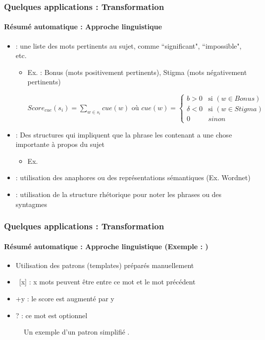 \documentclass[xcolor=table]{beamer}
\begin{document}
\begin{frame}
	\frametitle{Quelques applications : Transformation}
	\framesubtitle{Résumé automatique : Approche linguistique}
	
	\begin{itemize}
		\item {} : une liste des mots pertinents au sujet, comme ``significant", ``impossible", etc.
		\begin{itemize}
			\item Ex. \cite{69-edmundson} : Bonus (mots positivement pertinents), Stigma (mots négativement pertinents)
			
			$Score_{cue}(s_i) = \sum_{w \in s_i}{cue(w)}
			\text{ où }
			cue(w) = \left\lbrace 
			\begin{array}{ll}
			b > 0 & \text{si } (w \in Bonus) \\
			\delta < 0 & \text{si } (w \in Stigma) \\
			0 & sinon 
			\end{array} 
			\right. $
		\end{itemize}
		\item {} : Des structures qui impliquent que la phrase les contenant a une chose importante à propos du sujet
		\begin{itemize}
			\item Ex. 
		\end{itemize}
		\item {} : utilisation des anaphores ou des représentations sémantiques (Ex. Wordnet)
		\item {} : utilisation de la structure rhétorique pour noter les phrases ou des syntagmes
	\end{itemize}
	
\end{frame}

\begin{frame}
	\frametitle{Quelques applications : Transformation}
	\framesubtitle{Résumé automatique : Approche linguistique (Exemple : \cite{81-paice})}
	
	\begin{itemize}
		\item Utilisation des patrons (templates) préparés manuellement
		\item\ [x] : x mots peuvent être entre ce mot et le mot précédent
		\item +y : le score est augmenté par y
		\item ? : ce mot est optionnel
	\end{itemize}

	\begin{figure}[!ht]
		\begin{center}
			\caption{Un exemple d'un patron simplifié \cite{81-paice}.}
			\label{fig:paice-template}
		\end{center}
	\end{figure}
	
\end{frame}
\end{document}
